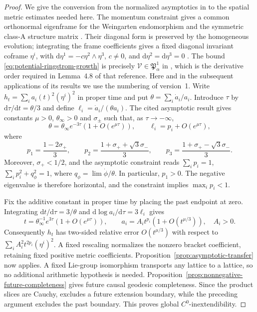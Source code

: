 \documentclass[10pt,a4paper]{article}
\numberwithin{equation}{section}
\theoremstyle{definition}
\theoremstyle{remark}
\newcommand{\dd}{\mathrm d}
\begin{document}
\begin{proof}
We give the conversion from the normalized asymptotics in
\cite[Lemma~4.8]{Ringstrom2025} to the spatial metric estimates needed
here.  The momentum constraint gives a common orthonormal eigenframe for the
Weingarten endomorphism and the symmetric class-A structure matrix
\cite[Lemma~2.4]{Ringstrom2025}.  Their diagonal form is preserved by
the homogeneous evolution; integrating the frame coefficients gives
a fixed diagonal invariant coframe $\eta^i$, with
$\dd\eta^1=-c\eta^2\wedge\eta^3$, $c\ne0$, and
$\dd\eta^2=\dd\eta^3=0$
\cite[proof of Proposition~1.31, equation~(3.13)]{Ringstrom2025}.
The bound \eqref{eq:potential-ringstrom-growth} is precisely
$\mathcal V\in\mathfrak P^1_\alpha$ in
\cite[Definition~1.44]{Ringstrom2025}, which is the derivative order
required in Lemma~4.8 of that reference.  Here and in the subsequent
applications of its results we use the numbering of version~1.
Write $h_t=\sum_i a_i(t)^2(\eta^i)^2$ in proper time and put
$\theta=\sum_i\dot a_i/a_i$.  Introduce $\tau$ by
$\dd\tau/\dd t=\theta/3$ and define
$\ell_i=\dot a_i/(\theta a_i)$.
The cited asymptotic result gives constants $\mu>0$, $\theta_\infty>0$
and $\sigma_\pm$ such that, as $\tau\to-\infty$,
\begin{equation}\label{eq:normalized-to-metric}
 \theta=\theta_\infty e^{-3\tau}(1+O(e^{\mu\tau})),
 \qquad \ell_i=p_i+O(e^{\mu\tau}),
\end{equation}
where
\begin{equation}\label{eq:ringstrom-exponent-identification}
 p_1=\frac{1-2\sigma_+}{3},\qquad
 p_2=\frac{1+\sigma_++\sqrt3\sigma_-}{3},\qquad
 p_3=\frac{1+\sigma_+-\sqrt3\sigma_-}{3}.
\end{equation}
Moreover, $\sigma_+<1/2$, and the asymptotic constraint reads
$\sum_i p_i=1$, $\sum_i p_i^2+q_\phi^2=1$, where
$q_\phi=\lim\dot\phi/\theta$.  In particular, $p_1>0$.
The negative eigenvalue is therefore horizontal, and the constraint
implies $\max_i p_i<1$.

Fix the additive constant in proper time by placing the past endpoint
at zero.  Integrating $\dd t/\dd\tau=3/\theta$ and
$\dd\log a_i/\dd\tau=3\ell_i$ gives
\begin{equation}\label{eq:proper-time-ringstrom}
 t=\theta_\infty^{-1}e^{3\tau}(1+O(e^{\mu\tau})),\qquad
 a_i=A_i t^{p_i}(1+O(t^{\mu/3})),\quad A_i>0.
\end{equation}
Consequently $h_t$ has two-sided relative error $O(t^{\mu/3})$ with
respect to $\sum_i A_i^2t^{2p_i}(\eta^i)^2$.  A fixed rescaling
normalizes the nonzero bracket coefficient, retaining fixed positive
metric coefficients.  Proposition~\ref{prop:asymptotic-transfer} now
applies.  A fixed Lie-group isomorphism transports any lattice to a
lattice, so no additional arithmetic hypothesis is needed.
Proposition~\ref{prop:nonnegative-future-completeness} gives future
causal geodesic completeness.  Since the product slices are Cauchy,
\cite{GLS2018} excludes a future extension boundary, while the preceding
argument excludes the past boundary.  This proves global
$C^0$-inextendibility.
\end{proof}
\end{document}
